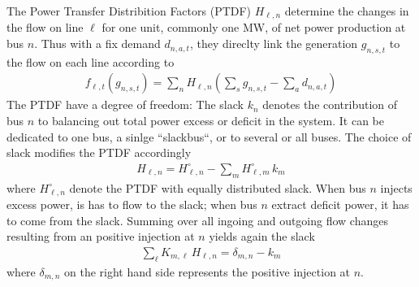 \documentclass[11pt]{article}
\newcommand{\generation}[1][n]{g_{#1,s,t}}
\newcommand{\demand}[1][n]{d_{#1,a,t}}
\newcommand{\incidence}[1][n]{K_{#1,\ell}}
\newcommand{\ptdf}[1][n]{H_{\ell,#1}}
\newcommand{\ptdfEqual}[1][n]{\ptdf[#1]^\circ}
\newcommand{\slack}[1][n]{k_{#1}}
\newcommand{\flow}{f_{\ell,t}}
\newcommand{\pdv}[2]{\frac{\partial #1}{\partial #2}}
\begin{document}
The Power Transfer Distribition Factors (PTDF) $\ptdf$ determine the changes in the flow on line $\ell$ for one unit, commonly one MW, of net power production at bus $n$. Thus with a fix demand $\demand$, they direclty link the generation $\generation$ to the flow on each line according to
\begin{align}
 \flow\left( \generation\right)  = \sum_n \ptdf \left( \sum_s \generation- \sum_a \demand \right)  
 \label{eq:flow_from_ptdf}
\end{align}
The PTDF have a degree of freedom: The slack $\slack$ denotes the contribution of bus $n$ to balancing out total power excess or deficit in the system. It can be dedicated to one bus, a sinlge ``slackbus``, or to several or all buses. The choice of slack modifies the PTDF accordingly 
\begin{align}
 \ptdf = \ptdfEqual - \sum_m \ptdfEqual[m]  \, \slack[m]
 \label{eq:ptdf_slacked}
\end{align}
where $\ptdfEqual$ denote the PTDF with equally distributed slack.
When bus $n$ injects excess power, is has to flow to the slack; when bus $n$ extract deficit power, it has to come from the slack. Summing over all ingoing and outgoing flow changes resulting from an positive injection at $n$ yields again the slack 
\begin{align}
\sum_\ell \incidence[m] \, \ptdf =  \delta_{m,n} - \slack[m] 
\label{eq:slack}
\end{align}
where $\delta_{m,n}$ on the right hand side represents the positive injection at $n$.
\end{document}
